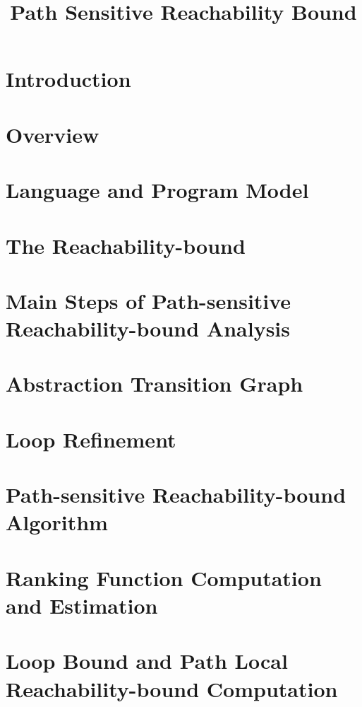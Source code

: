 \documentclass[a4paper,11pt]{article}
\begin{document}
\title{Path Sensitive Reachability Bound}

\author{}

\date{}

\maketitle
%
\tableofcontents


\section{Introduction}
\label{sec:intro}

\section{Overview}
\label{sec:overview}

\section{{Language and Program Model}}
\label{sec:language}

\section{{The Reachability-bound}}
\label{sec:execution_rb}

\section{Main Steps of Path-sensitive Reachability-bound Analysis}
\label{sec:static_rb}

\section{Abstraction Transition Graph}
\label{sec:progabs}

\section{Loop Refinement}
\label{sec:refine}

\section{Path-sensitive Reachability-bound Algorithm}
\label{sec:psrb}

\section{Ranking Function Computation and Estimation}
\label{sec:rank}

\section{Loop Bound and Path Local Reachability-bound Computation}
\label{sec:pathlocalrb}

\end{document}
